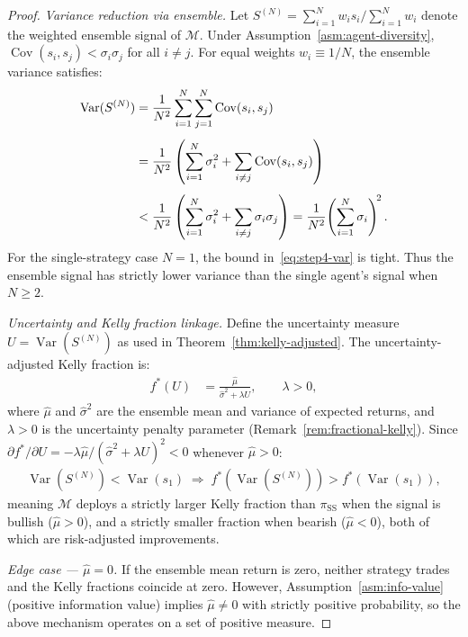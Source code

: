 \documentclass[12pt,openany]{book}
\numberwithin{equation}{chapter}
\theoremstyle{plain}
\theoremstyle{definition}
\theoremstyle{remark}
\numberwithin{equation}{chapter}
\theoremstyle{plain}
\DeclareMathOperator{\Var}{Var}
\DeclareMathOperator{\Cov}{Cov}
\begin{document}
\begin{proof}
\medskip
\noindent\textit{Variance reduction via ensemble.}
Let $S^{(N)} = \sum_{i=1}^N w_i s_i / \sum_{i=1}^N w_i$ denote the
weighted ensemble signal of $\mathcal{M}$.  Under
Assumption~\ref{asm:agent-diversity}, $\Cov(s_i,s_j) <
\sigma_i\sigma_j$ for all $i \ne j$.  For equal weights
$w_i \equiv 1/N$, the ensemble variance satisfies:
\begin{align}
  \Var(S^{(N)})
  &= \frac{1}{N^2}\sum_{i=1}^N\sum_{j=1}^N \Cov(s_i,s_j)
  \notag \\[4pt]
  &= \frac{1}{N^2}\left(
      \sum_{i=1}^N\sigma_i^2
      + \sum_{i \ne j}\Cov(s_i,s_j)
    \right)
  \notag \\[4pt]
  &< \frac{1}{N^2}\left(
      \sum_{i=1}^N\sigma_i^2
      + \sum_{i \ne j}\sigma_i\sigma_j
    \right)
  = \frac{1}{N^2}\!\left(\sum_{i=1}^N\sigma_i\right)^{\!2}.
  \label{eq:step4-var}
\end{align}
For the single-strategy case $N=1$, the bound in~\eqref{eq:step4-var}
is tight.  Thus the ensemble signal has strictly lower variance than
the single agent's signal when $N \ge 2$.

\medskip
\noindent\textit{Uncertainty and Kelly fraction linkage.}
Define the uncertainty measure $U = \Var(S^{(N)})$ as used in
Theorem~\ref{thm:kelly-adjusted}.  The uncertainty-adjusted Kelly
fraction is:
\begin{align}
  f^{*}(U)
  &= \frac{\hat{\mu}}{\hat{\sigma}^2 + \lambda U},
  \qquad \lambda > 0,
  \label{eq:step4-kelly}
\end{align}
where $\hat{\mu}$ and $\hat{\sigma}^2$ are the ensemble mean and
variance of expected returns, and $\lambda > 0$ is the uncertainty
penalty parameter (Remark~\ref{rem:fractional-kelly}).  Since
$\partial f^{*}/\partial U = -\lambda\hat{\mu}/(\hat{\sigma}^2
+ \lambda U)^2 < 0$ whenever $\hat{\mu} > 0$:
\begin{align}
  \Var(S^{(N)}) < \Var(s_1)
  \;\Rightarrow\;
  f^{*}\!\left(\Var(S^{(N)})\right) > f^{*}\!\left(\Var(s_1)\right),
  \label{eq:step4-kelly-ineq}
\end{align}
meaning $\mathcal{M}$ deploys a strictly larger Kelly fraction
than $\pi_{\mathrm{SS}}$ when the signal is bullish ($\hat{\mu}>0$),
and a strictly smaller fraction when bearish ($\hat{\mu}<0$),
both of which are risk-adjusted improvements.

\medskip
\noindent\textit{Edge case — $\hat{\mu} = 0$.}
If the ensemble mean return is zero, neither strategy trades and
the Kelly fractions coincide at zero.  However,
Assumption~\ref{asm:info-value} (positive information value)
implies $\hat{\mu} \ne 0$ with strictly positive probability,
so the above mechanism operates on a set of positive measure.


\end{proof}
\end{document}
